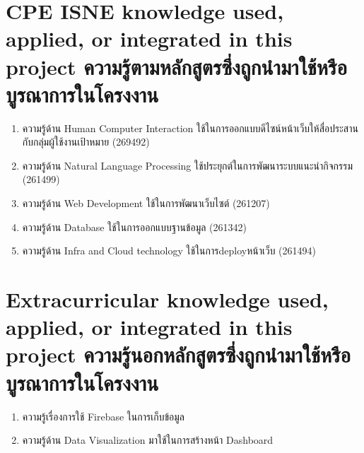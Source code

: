 
\section{\ifenglish%
\ifcpe CPE \else ISNE \fi knowledge used, applied, or integrated in this project
\else%
ความรู้ตามหลักสูตรซึ่งถูกนำมาใช้หรือบูรณาการในโครงงาน
\fi
}
\begin{enumerate}
    \item ความรู้ด้าน Human Computer Interaction ใช้ในการออกแบบดีไซน์หน้าเว็บให้สื่อประสานกับกลุ่มผู้ใช้งานเป้าหมาย (269492)
    \item ความรู้ด้าน Natural Language Processing ใช้ประยุกต์ในการพัฒนาระบบแนะนำกิจกรรม (261499)
    \item ความรู้ด้าน Web Development ใช้ในการพัฒนาเว็บไซต์ (261207)
    \item ความรู้ด้าน Database ใช้ในการออกแบบฐานข้อมูล (261342)
    \item ความรู้ด้าน Infra and Cloud technology ใช้ในการdeployหน้าเว็บ (261494)
\end{enumerate}


\section{\ifenglish%
Extracurricular knowledge used, applied, or integrated in this project
\else%
ความรู้นอกหลักสูตรซึ่งถูกนำมาใช้หรือบูรณาการในโครงงาน
\fi
}
\begin{enumerate}
    \item ความรู้เรื่องการใช้ Firebase ในการเก็บข้อมูล
    \item ความรู้ด้าน Data Visualization มาใช้ในการสร้างหน้า Dashboard
\end{enumerate}


